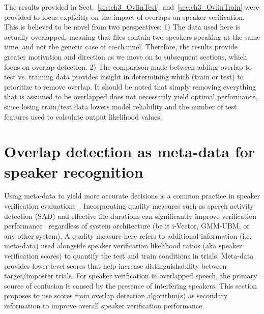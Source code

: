 The results provided in Sect.~\ref{sec:ch3_OvlinTest}~and~\ref{sec:ch3_OvlinTrain} were provided to focus explicitly on the impact of overlaps on speaker verification. 
This is believed to be novel from two perspectives: 
1) The data used here is actually overlapped, meaning that files contain two speakers speaking at the same time, and not the generic case of co-channel. Therefore, the results provide greater motivation and direction as we move on to subsequent sections, which focus on overlap detection. 
2) The comparison made between adding overlap to test vs. training data provides insight in determining which (train or test) to prioritize to remove overlap. It should be noted that simply removing everything that is assumed to be overlapped does not necessarily yield optimal performance, since losing train/test data lowers model reliability and the number of test features used to calculate output likelihood values. 


\section{Overlap detection as meta-data for speaker recognition}
\label{sec:ch2_OvlQualityMeasure} 
Using meta-data to yield more accurate decisions is a common practice in speaker verification evaluations~\cite{bosaris,qual_sid_13}. 
Incorporating quality measures such as speech activity detection (SAD) and effective file durations can significantly improve verification performance~\cite{qual_sid_13,CRSSSRE12} regardless of system architecture (be it i-Vector, GMM-UBM, or any other system). 
A quality measure here refers to additional information (i.e. meta-data) used alongside speaker verification likelihood ratios (aka speaker verification scores) to quantify the test and train conditions in trials. 
Meta-data provides lower-level scores that help increase distinguishability between target/imposter trials. 
For speaker verification in overlapped speech, the primary source of confusion is caused by the presence of interfering speakers. 
This section proposes to use scores from overlap detection algorithm(s) as secondary information to improve overall speaker verification performance. 

